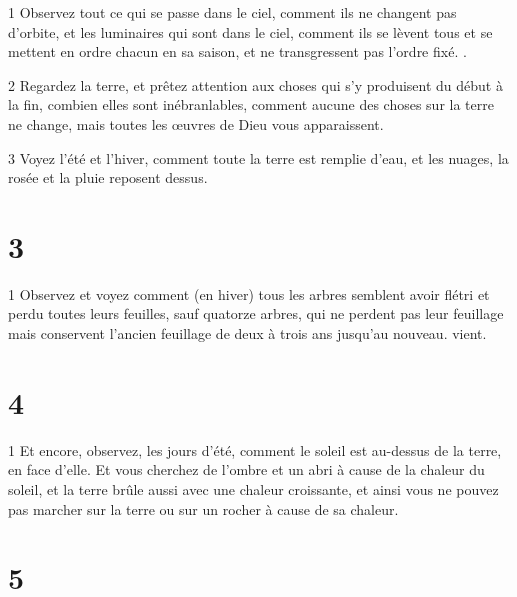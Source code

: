\par 1 Observez tout ce qui se passe dans le ciel, comment ils ne changent pas d'orbite, et les luminaires qui sont dans le ciel, comment ils se lèvent tous et se mettent en ordre chacun en sa saison, et ne transgressent pas l'ordre fixé. .
\par 2 Regardez la terre, et prêtez attention aux choses qui s'y produisent du début à la fin, combien elles sont inébranlables, comment aucune des choses sur la terre ne change, mais toutes les œuvres de Dieu vous apparaissent.
\par 3 Voyez l'été et l'hiver, comment toute la terre est remplie d'eau, et les nuages, la rosée et la pluie reposent dessus.

\chapter{3}

\par 1 Observez et voyez comment (en hiver) tous les arbres semblent avoir flétri et perdu toutes leurs feuilles, sauf quatorze arbres, qui ne perdent pas leur feuillage mais conservent l'ancien feuillage de deux à trois ans jusqu'au nouveau. vient.

\chapter{4}

\par 1 Et encore, observez, les jours d'été, comment le soleil est au-dessus de la terre, en face d'elle. Et vous cherchez de l'ombre et un abri à cause de la chaleur du soleil, et la terre brûle aussi avec une chaleur croissante, et ainsi vous ne pouvez pas marcher sur la terre ou sur un rocher à cause de sa chaleur.

\chapter{5}

